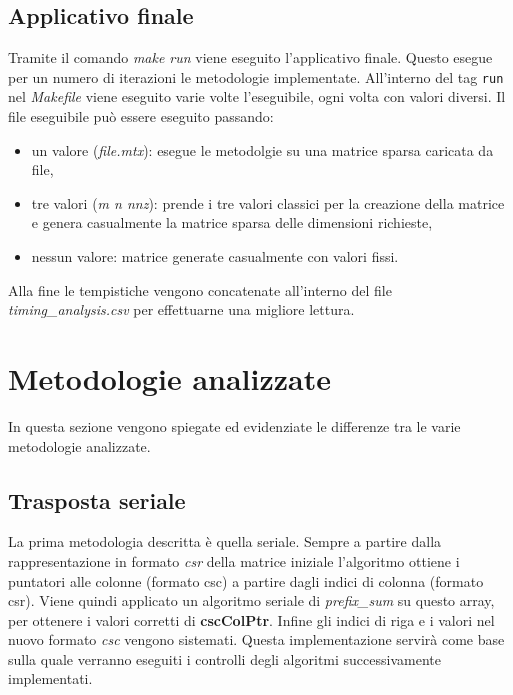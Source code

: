 \documentclass[]{IEEEtran}
\begin{document}
	\subsection{Applicativo finale}
	\label{applicativo-finale}
	Tramite il comando \textit{make run} viene eseguito l'applicativo finale. Questo esegue per un numero di iterazioni le metodologie implementate. All'interno del tag \texttt{run} nel \textit{Makefile} viene eseguito varie volte l'eseguibile, ogni volta con valori diversi.\newline
	Il file eseguibile può essere eseguito passando:
	\begin{itemize}
		\item un valore (\textit{file.mtx}): esegue le metodolgie su una matrice sparsa caricata da file,
		\item tre valori (\textit{m n nnz}): prende i tre valori classici per la creazione della matrice e genera casualmente la matrice sparsa delle dimensioni richieste,
		\item nessun valore: matrice generate casualmente con valori fissi.
	\end{itemize}
	Alla fine le tempistiche vengono concatenate all'interno del file \textit{timing\_analysis.csv} per effettuarne una migliore lettura.


\section{Metodologie analizzate}
\label{metodologie}
	In questa sezione vengono spiegate ed evidenziate le differenze tra le varie metodologie analizzate. 
		
	\subsection{Trasposta seriale}
	La prima metodologia descritta è quella seriale. Sempre a partire dalla rappresentazione in formato \textit{csr} della matrice iniziale l'algoritmo ottiene i puntatori alle colonne (formato csc) a partire dagli indici di colonna (formato csr). Viene quindi applicato un algoritmo seriale di \textit{prefix\_sum} su questo array, per ottenere i valori corretti di \textbf{cscColPtr}. Infine gli indici di riga e i valori nel nuovo formato \textit{csc} vengono sistemati.\newline
	Questa implementazione servirà come base sulla quale verranno eseguiti i controlli degli algoritmi successivamente implementati.
	
\end{document}
